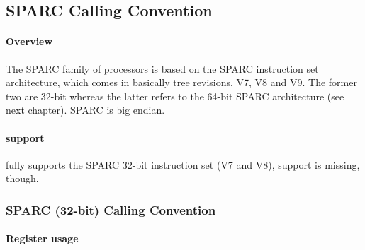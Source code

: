 %
%
%
%

\subsection{SPARC Calling Convention}

\paragraph{Overview}

The SPARC family of processors is based on the SPARC instruction set architecture, which comes in basically tree revisions,
V7, V8 and V9. The former two are 32-bit whereas the latter refers to the 64-bit SPARC architecture (see next chapter). SPARC is big endian.

\paragraph{ support}

 fully supports the SPARC 32-bit instruction set (V7 and V8),  support is missing, though.

\subsubsection{SPARC (32-bit) Calling Convention}

\paragraph{Register usage}

